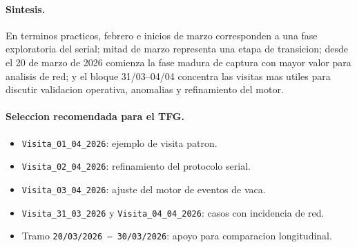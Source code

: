 \paragraph{Sintesis.}
En terminos practicos, febrero e inicios de marzo corresponden a una fase
exploratoria del serial; mitad de marzo representa una etapa de transicion;
desde el 20 de marzo de 2026 comienza la fase madura de captura con mayor valor
para analisis de red; y el bloque 31/03--04/04 concentra las visitas mas utiles
para discutir validacion operativa, anomalias y refinamiento del motor.

\paragraph{Seleccion recomendada para el TFG.}
\begin{itemize}
\item \texttt{Visita\_01\_04\_2026}: ejemplo de visita patron.
\item \texttt{Visita\_02\_04\_2026}: refinamiento del protocolo serial.
\item \texttt{Visita\_03\_04\_2026}: ajuste del motor de eventos de vaca.
\item \texttt{Visita\_31\_03\_2026} y \texttt{Visita\_04\_04\_2026}: casos con incidencia de red.
\item Tramo \texttt{20/03/2026 -- 30/03/2026}: apoyo para comparacion longitudinal.
\end{itemize}
